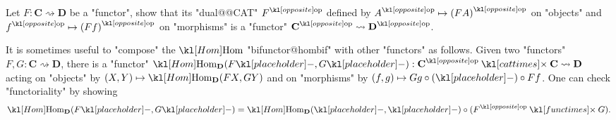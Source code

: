 \documentclass[main.tex]{subfiles}
\begin{document}
\begin{exer}\label{exer:duality:oppositefunc}
	Let $F: \mathbf{C} \rightsquigarrow \mathbf{D}$ be a "functor", show that its "dual@@CAT" $\op{F}$ defined by $\op{A} \mapsto \op{(FA)}$ on "objects" and $\op{f} \mapsto \op{(Ff)}$ on "morphisms" is a "functor" $\op{\mathbf{C}} \rightsquigarrow \op{\mathbf{D}}$. 
\end{exer}
\begin{rem}\label{rem:hombifunctor}
	It is sometimes useful to "compose" the $\Hom$ "bifunctor@hombif" with other "functors" as follows. Given two "functors" $F,G: \mathbf{C} \rightsquigarrow \mathbf{D}$, there is a "functor" $\Hom_{\mathbf{D}}(F\placeholder,G\placeholder): \op{\mathbf{C}} \cattimes \mathbf{C} \rightsquigarrow \mathbf{D}$ acting on "objects" by $(X,Y) \mapsto \Hom_{\mathbf{D}}(FX,GY)$ and on "morphisms" by $(f,g) \mapsto Gg \circ (\placeholder) \circ Ff$.	One can check "functoriality" by showing
	\[\Hom_{\mathbf{D}}(F\placeholder,G\placeholder) = \Hom_{\mathbf{D}}(\placeholder,\placeholder) \circ (\op{F}\functimes G).\]
\end{rem}
\end{document}
